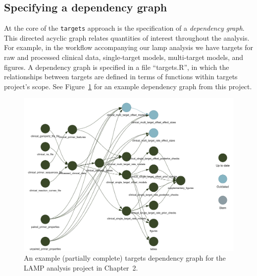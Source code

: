 \documentclass[../thesis.tex]{subfiles}
\begin{document}
\subsection{Specifying a dependency graph}
At the core of the \texttt{targets} approach is the specification of a \emph{dependency graph}. This directed acyclic graph relates quantities of interest throughout the analysis. For example, in the workflow accompanying our \gls{lamp} analysis we have targets for raw and processed clinical data, single-target models, multi-target models, and figures. A dependency graph is specified in a file ``targets.R'', in which the relationships between targets are defined in terms of functions within targets project's scope. See Figure~\ref{fig:targets_before_change} for an example dependency graph from this project.

\begin{figure}
    \centering
    \includegraphics[width=\textwidth]{figures/misc/targets_before_change.png}
    \caption{An example (partially complete) targets dependency graph for the LAMP analysis project in Chapter~2.}
    \label{fig:targets_before_change}
\end{figure}
\end{document}
